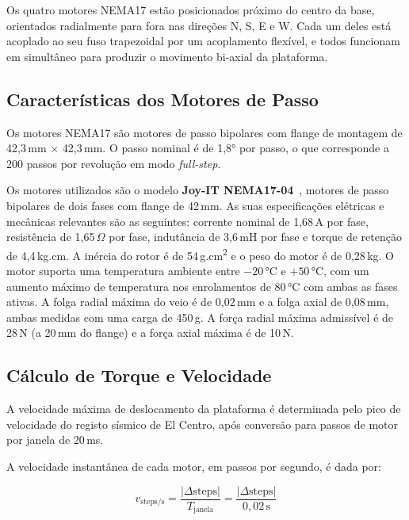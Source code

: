Os quatro motores NEMA17 estão posicionados próximo do centro da base, orientados radialmente para fora nas direções N, S, E e W. Cada um deles está acoplado ao seu fuso trapezoidal por um acoplamento flexível, e todos funcionam em simultâneo para produzir o movimento bi-axial da plataforma.


\subsection{Características dos Motores de Passo}
\label{subsec:caracteristicas-motores}

Os motores NEMA17 são motores de passo bipolares com flange de montagem de 42,3\,mm $\times$ 42,3\,mm. O passo nominal é de 1,8° por passo, o que corresponde a 200 passos por revolução em modo \textit{full-step}.

Os motores utilizados são o modelo \textbf{Joy-IT NEMA17-04}~\cite{JoyITNEMA17}, motores de passo bipolares de dois fases com flange de 42\,mm. As suas especificações elétricas e mecânicas relevantes são as seguintes: corrente nominal de 1,68\,A por fase, resistência de 1,65\,$\Omega$ por fase, indutância de 3,6\,mH por fase e torque de retenção de 4,4\,kg.cm. A inércia do rotor é de 54\,g.cm\textsuperscript{2} e o peso do motor é de 0,28\,kg. O motor suporta uma temperatura ambiente entre $-20$\,°C e $+50$\,°C, com um aumento máximo de temperatura nos enrolamentos de 80\,°C com ambas as fases ativas. A folga radial máxima do veio é de 0,02\,mm e a folga axial de 0,08\,mm, ambas medidas com uma carga de 450\,g. A força radial máxima admissível é de 28\,N (a 20\,mm do flange) e a força axial máxima é de 10\,N.



\subsection{Cálculo de Torque e Velocidade}
\label{subsec:calculo-torque}

A velocidade máxima de deslocamento da plataforma é determinada pelo pico de velocidade do registo sísmico de El Centro, após conversão para passos de motor por janela de 20\,ms.

A velocidade instantânea de cada motor, em passos por segundo, é dada por:

\begin{equation}
v_{\text{steps/s}} = \frac{|\Delta\text{steps}|}{T_{\text{janela}}} = \frac{|\Delta\text{steps}|}{0{,}02\,\text{s}}
\label{eq:velocidade-motor}
\end{equation}

